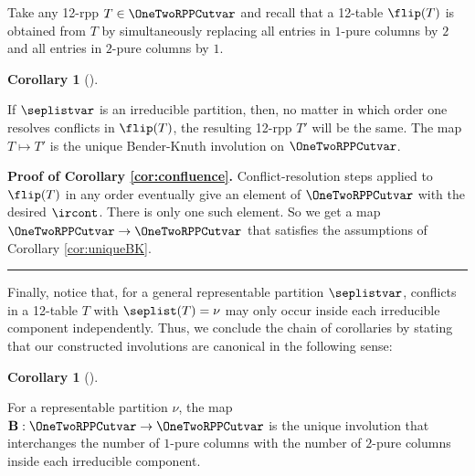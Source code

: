 \documentclass[numbers=enddot,12pt,final,onecolumn,notitlepage]{scrartcl}%
\theoremstyle{definition}
\newtheorem{coro}[theo]{Corollary}
\newenvironment{corollary}[1][]
{\begin{coro}[#1]\begin{leftbar}}
{\end{leftbar}\end{coro}}
\newenvironment{proof}[1][Proof]{\noindent\textbf{#1.} }{\ \rule{0.5em}{0.5em}}
\begin{document}
Take any 12-rpp $T\in\OneTwoRPPCutvar$ and recall that a 12-table $\flip(T)$ is obtained from $T$ by simultaneously replacing all entries in $1$-pure columns by $2$ and all entries in $2$-pure columns by $1$. 

\begin{corollary}
\label{cor:confluence}
 If $\seplistvar$ is an irreducible partition, then, no matter in which order one resolves conflicts in $\flip(T)$, the resulting 12-rpp $T'$ will be the same. The map $T\mapsto T'$ is the unique Bender-Knuth involution on $\OneTwoRPPCutvar$.
\end{corollary}
\begin{proof}[Proof of Corollary \ref{cor:confluence}]
 Conflict-resolution steps applied to $\flip(T)$ in any order eventually give an element of $\OneTwoRPPCutvar$ with the desired $\ircont$. There is only one such element. So we get a map $\OneTwoRPPCutvar\to \OneTwoRPPCutvar$ that satisfies the assumptions of Corollary \ref{cor:uniqueBK}.
\end{proof}

Finally, notice that, for a general representable partition $\seplistvar$, conflicts in a 12-table $T$ with $\seplist(T) = \nu$ may only occur inside each irreducible component independently. Thus, we conclude the chain of corollaries by stating that our constructed involutions are canonical in the following sense:

\begin{corollary}
 For a representable partition $\nu$, the map $\mathbf{B}:\OneTwoRPPCutvar\to\OneTwoRPPCutvar$ is the unique involution that interchanges the number of $1$-pure columns with the number of $2$-pure columns inside each irreducible component.
\end{corollary}
\end{document}
